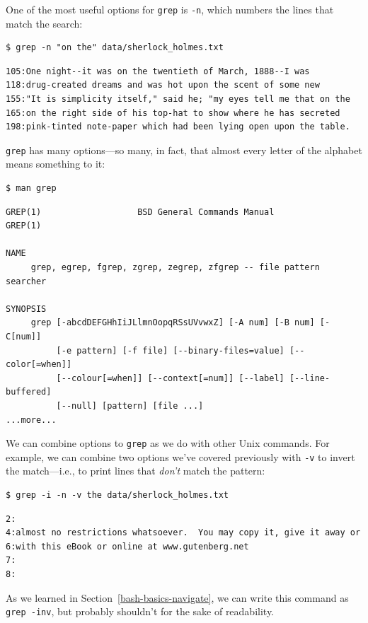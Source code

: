 \documentclass[
]{krantz}
\begin{document}
One of the most useful options for \texttt{grep} is \texttt{-n},
which numbers the lines that match the search:

\begin{verbatim}
$ grep -n "on the" data/sherlock_holmes.txt
\end{verbatim}

\begin{verbatim}
105:One night--it was on the twentieth of March, 1888--I was
118:drug-created dreams and was hot upon the scent of some new
155:"It is simplicity itself," said he; "my eyes tell me that on the
165:on the right side of his top-hat to show where he has secreted
198:pink-tinted note-paper which had been lying open upon the table.
\end{verbatim}

\texttt{grep} has many options---so many,
in fact,
that almost every letter of the alphabet means something to it:

\begin{verbatim}
$ man grep
\end{verbatim}

\begin{verbatim}
GREP(1)                   BSD General Commands Manual                  GREP(1)

NAME
     grep, egrep, fgrep, zgrep, zegrep, zfgrep -- file pattern searcher

SYNOPSIS
     grep [-abcdDEFGHhIiJLlmnOopqRSsUVvwxZ] [-A num] [-B num] [-C[num]]
          [-e pattern] [-f file] [--binary-files=value] [--color[=when]]
          [--colour[=when]] [--context[=num]] [--label] [--line-buffered]
          [--null] [pattern] [file ...]
...more...
\end{verbatim}

We can combine options to \texttt{grep} as we do with other Unix commands.
For example,
we can combine two options we've covered previously with \texttt{-v}
to invert the match---i.e.,
to print lines that \emph{don't} match the pattern:

\begin{verbatim}
$ grep -i -n -v the data/sherlock_holmes.txt
\end{verbatim}

\begin{verbatim}
2:
4:almost no restrictions whatsoever.  You may copy it, give it away or
6:with this eBook or online at www.gutenberg.net
7:
8:
\end{verbatim}

As we learned in Section~\ref{bash-basics-navigate},
we can write this command as \texttt{grep\ -inv},
but probably shouldn't for the sake of readability.
\end{document}
